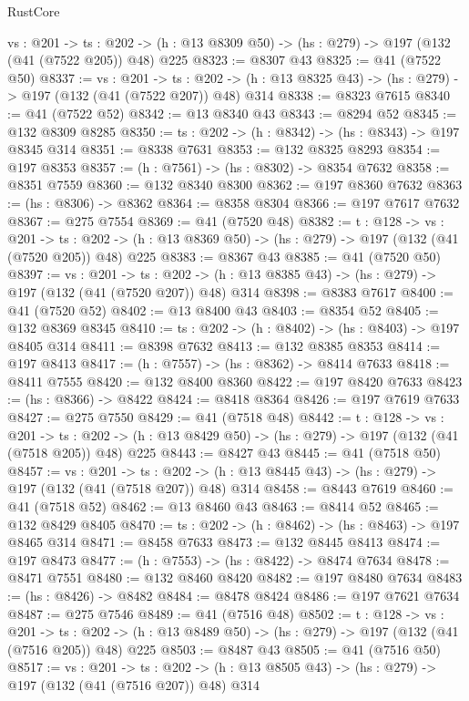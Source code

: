 \begin{lexlean}{RustCore}
\begin{coremodule}
  {vs : @201} ->
  {ts : @202} -> (h : @13 @8309 @50) -> (hs : @279) -> @197 (@132 (@41 (@7522 @205)) @48) @225
@8323 := @8307 @43
@8325 := @41 (@7522 @50)
@8337 := {vs : @201} ->
  {ts : @202} -> (h : @13 @8325 @43) -> (hs : @279) -> @197 (@132 (@41 (@7522 @207)) @48) @314
@8338 := @8323 @7615
@8340 := @41 (@7522 @52)
@8342 := @13 @8340 @43
@8343 := @8294 @52
@8345 := @132 @8309 @8285
@8350 := {ts : @202} -> (h : @8342) -> (hs : @8343) -> @197 @8345 @314
@8351 := @8338 @7631
@8353 := @132 @8325 @8293
@8354 := @197 @8353
@8357 := (h : @7561) -> (hs : @8302) -> @8354 @7632
@8358 := @8351 @7559
@8360 := @132 @8340 @8300
@8362 := @197 @8360 @7632
@8363 := (hs : @8306) -> @8362
@8364 := @8358 @8304
@8366 := @197 @7617 @7632
@8367 := @275 @7554
@8369 := @41 (@7520 @48)
@8382 := {t : @128} ->
  {vs : @201} ->
  {ts : @202} -> (h : @13 @8369 @50) -> (hs : @279) -> @197 (@132 (@41 (@7520 @205)) @48) @225
@8383 := @8367 @43
@8385 := @41 (@7520 @50)
@8397 := {vs : @201} ->
  {ts : @202} -> (h : @13 @8385 @43) -> (hs : @279) -> @197 (@132 (@41 (@7520 @207)) @48) @314
@8398 := @8383 @7617
@8400 := @41 (@7520 @52)
@8402 := @13 @8400 @43
@8403 := @8354 @52
@8405 := @132 @8369 @8345
@8410 := {ts : @202} -> (h : @8402) -> (hs : @8403) -> @197 @8405 @314
@8411 := @8398 @7632
@8413 := @132 @8385 @8353
@8414 := @197 @8413
@8417 := (h : @7557) -> (hs : @8362) -> @8414 @7633
@8418 := @8411 @7555
@8420 := @132 @8400 @8360
@8422 := @197 @8420 @7633
@8423 := (hs : @8366) -> @8422
@8424 := @8418 @8364
@8426 := @197 @7619 @7633
@8427 := @275 @7550
@8429 := @41 (@7518 @48)
@8442 := {t : @128} ->
  {vs : @201} ->
  {ts : @202} -> (h : @13 @8429 @50) -> (hs : @279) -> @197 (@132 (@41 (@7518 @205)) @48) @225
@8443 := @8427 @43
@8445 := @41 (@7518 @50)
@8457 := {vs : @201} ->
  {ts : @202} -> (h : @13 @8445 @43) -> (hs : @279) -> @197 (@132 (@41 (@7518 @207)) @48) @314
@8458 := @8443 @7619
@8460 := @41 (@7518 @52)
@8462 := @13 @8460 @43
@8463 := @8414 @52
@8465 := @132 @8429 @8405
@8470 := {ts : @202} -> (h : @8462) -> (hs : @8463) -> @197 @8465 @314
@8471 := @8458 @7633
@8473 := @132 @8445 @8413
@8474 := @197 @8473
@8477 := (h : @7553) -> (hs : @8422) -> @8474 @7634
@8478 := @8471 @7551
@8480 := @132 @8460 @8420
@8482 := @197 @8480 @7634
@8483 := (hs : @8426) -> @8482
@8484 := @8478 @8424
@8486 := @197 @7621 @7634
@8487 := @275 @7546
@8489 := @41 (@7516 @48)
@8502 := {t : @128} ->
  {vs : @201} ->
  {ts : @202} -> (h : @13 @8489 @50) -> (hs : @279) -> @197 (@132 (@41 (@7516 @205)) @48) @225
@8503 := @8487 @43
@8505 := @41 (@7516 @50)
@8517 := {vs : @201} ->
  {ts : @202} -> (h : @13 @8505 @43) -> (hs : @279) -> @197 (@132 (@41 (@7516 @207)) @48) @314

\end{coremodule}
\end{lexlean}
